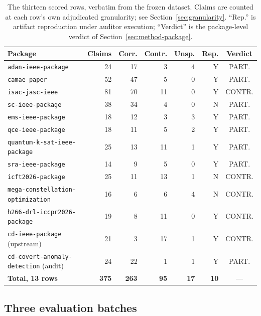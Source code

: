 \documentclass[sigconf,review]{acmart}
\newcommand{\pkb}[1]{\texttt{\allowbreak{}#1}}
\begin{document}
\begin{table}[t]
\centering
\caption{The thirteen scored rows, verbatim from the frozen dataset. Claims
are counted at each row's own adjudicated granularity; see
Section~\ref{sec:granularity}. ``Rep.'' is artifact reproduction under
auditor execution; ``Verdict'' is the package-level verdict of
Section~\ref{sec:method-package}.}
\label{tab:rows}
\scriptsize
\setlength{\tabcolsep}{2.6pt}
\begin{tabular}{>{\raggedright\arraybackslash}p{}rrrrrc}
\toprule
Package & Claims & Corr. & Contr. & Unsp. & Rep. & Verdict \\
\midrule
\pkb{adan-ieee-package}                & 24 & 17 &  3 & 4 & Y & PART. \\
\pkb{camae-paper}                      & 52 & 47 &  5 & 0 & Y & PART. \\
\pkb{isac-jasc-ieee}                   & 81 & 70 & 11 & 0 & Y & CONTR. \\
\pkb{sc-ieee-package}                  & 38 & 34 &  4 & 0 & N & PART. \\
\pkb{ems-ieee-package}                 & 18 & 12 &  3 & 3 & Y & PART. \\
\pkb{qce-ieee-package}                 & 18 & 11 &  5 & 2 & Y & PART. \\
\pkb{quantum-k-sat-ieee-package}       & 25 & 13 & 11 & 1 & Y & PART. \\
\pkb{sra-ieee-package}                 & 14 &  9 &  5 & 0 & Y & PART. \\
\pkb{icft2026-package}                 & 25 & 11 & 13 & 1 & N & CONTR. \\
\pkb{mega-constellation-optimization}  & 16 &  6 &  6 & 4 & N & CONTR. \\
\pkb{h266-drl-iccpr2026-package}       & 19 &  8 & 11 & 0 & Y & CONTR. \\
\pkb{cd-ieee-package} (upstream)       & 21 &  3 & 17 & 1 & Y & CONTR. \\
\pkb{cd-covert-anomaly-detection} (audit) & 24 & 22 & 1 & 1 & Y & PART. \\
\midrule
\textbf{Total, 13 rows}                & \textbf{375} & \textbf{263} &
\textbf{95} & \textbf{17} & \textbf{10} & --- \\
\bottomrule
\end{tabular}
\end{table}

\subsection{Three evaluation batches}
\label{sec:dataset-batches}
\end{document}
